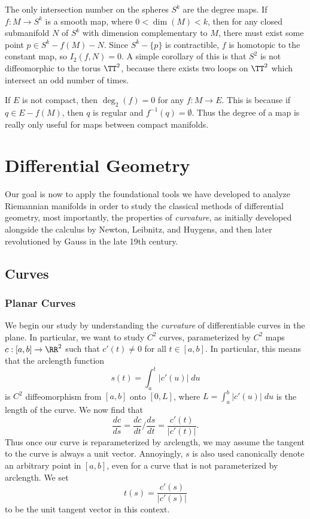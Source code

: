 \begin{example}
    The only intersection number on the spheres $S^k$ are the degree maps. If $f: M \to S^k$ is a smooth map, where $0 < \dim(M) < k$, then for any closed submanifold $N$ of $S^k$ with dimension complementary to $M$, there must exist some point $p \in S^k - f(M) - N$. Since $S^k - \{ p \}$ is contractible, $f$ is homotopic to the constant map, so $I_2(f,N) = 0$. A simple corollary of this is that $S^2$ is not diffeomorphic to the torus $\TT^2$, because there exists two loops on $\TT^2$ which intersect an odd number of times.
\end{example}

If $E$ is not compact, then $\deg_2(f) = 0$ for any $f: M \to E$. This is because if $q \in E - f(M)$, then $q$ is regular and $f^{-1}(q) = \emptyset$. Thus the degree of a map is really only useful for maps between compact manifolds.













\part{Differential Geometry}

Our goal is now to apply the foundational tools we have developed to analyze Riemannian manifolds in order to study the classical methods of differential geometry, most importantly, the properties of \emph{curvature}, as initially developed alongside the calculus by Newton, Leibnitz, and Huygens, and then later revolutioned by Gauss in the late 19th century.

\chapter{Curves}

\section{Planar Curves}

We begin our study by understanding the \emph{curvature} of differentiable curves in the plane. In particular, we want to study $C^2$ curves, parameterized by $C^2$ maps $c: [a,b] \to \RR^2$ such that $c'(t) \neq 0$ for all $t \in [a,b]$. In particular, this means that the arclength function
%
\[ s(t) = \int_a^t |c'(u)|\; du \]
%
is $C^2$ diffeomorphism from $[a,b]$ onto $[0,L]$, where $L = \int_a^b |c'(u)|\; du$ is the length of the curve. We now find that
%
\[ \frac{dc}{ds} = \frac{dc}{dt} \bigg/ \frac{ds}{dt} = \frac{c'(t)}{|c'(t)|}. \]
%
Thus once our curve is reparameterized by arclength, we may assume the tangent to the curve is always a unit vector. Annoyingly, $s$ is also used canonically denote an arbitrary point in $[a,b]$, even for a curve that is not parameterized by arclength. We set
%
\[ t(s) = \frac{c'(s)}{|c'(s)|} \]
%
to be the unit tangent vector in this context.

